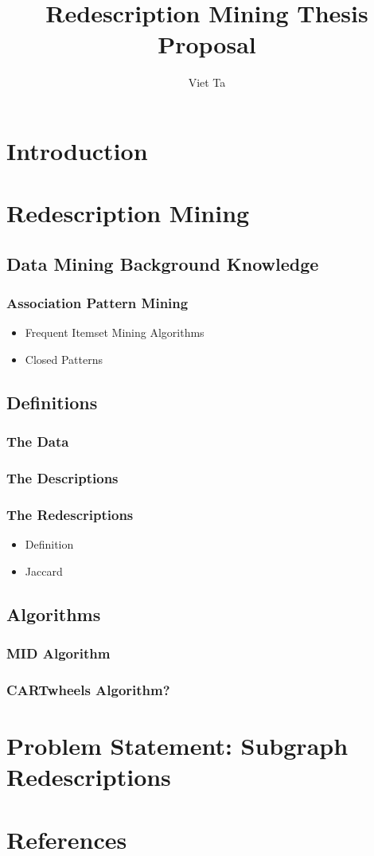 \documentclass[12pt,a4paper,draft]{article}
\author{Viet Ta}
\title{Redescription Mining Thesis Proposal}
\begin{document}
\section{Introduction}
\section{Redescription Mining}
\subsection{Data Mining Background Knowledge}
\subsubsection{Association Pattern Mining}
\begin{itemize}
\item Frequent Itemset Mining Algorithms
\item Closed Patterns
\end{itemize}
\subsection{Definitions}
\subsubsection{The Data}
\subsubsection{The Descriptions}
\subsubsection{The Redescriptions}
\begin{itemize}
	\item{Definition}
    \item{Jaccard}
\end{itemize}
\subsection{Algorithms}
\subsubsection{MID Algorithm}
\subsubsection{CARTwheels Algorithm?}
\section{Problem Statement: Subgraph Redescriptions}
\section{References}
\end{document}
